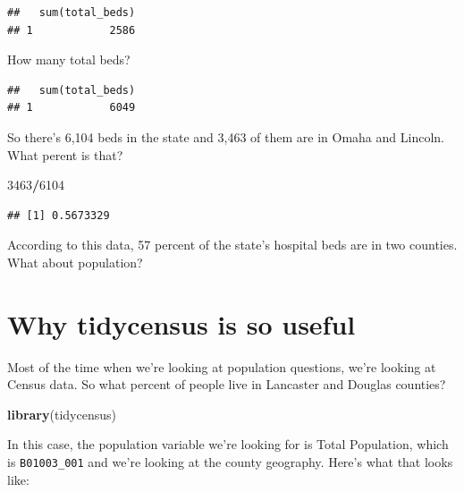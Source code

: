 \documentclass[]{book}
\newenvironment{Shaded}{\begin{snugshade}}{\end{snugshade}}
\newcommand{\DecValTok}[1]{\textcolor[rgb]{0.00,0.00,0.81}{#1}}
\newcommand{\KeywordTok}[1]{\textcolor[rgb]{0.13,0.29,0.53}{\textbf{#1}}}
\newcommand{\NormalTok}[1]{#1}
\newcommand{\OperatorTok}[1]{\textcolor[rgb]{0.81,0.36,0.00}{\textbf{#1}}}
\newcommand{\StringTok}[1]{\textcolor[rgb]{0.31,0.60,0.02}{#1}}
\begin{document}
\begin{verbatim}
##   sum(total_beds)
## 1            2586
\end{verbatim}

How many total beds?

\begin{Shaded}
\end{Shaded}

\begin{verbatim}
##   sum(total_beds)
## 1            6049
\end{verbatim}

So there's 6,104 beds in the state and 3,463 of them are in Omaha and Lincoln. What perent is that?

\begin{Shaded}
\begin{Highlighting}[]
\DecValTok{3463}\OperatorTok{/}\DecValTok{6104}
\end{Highlighting}
\end{Shaded}

\begin{verbatim}
## [1] 0.5673329
\end{verbatim}

According to this data, 57 percent of the state's hospital beds are in two counties. What about population?

\hypertarget{why-tidycensus-is-so-useful}{%
\section{Why tidycensus is so useful}\label{why-tidycensus-is-so-useful}}

Most of the time when we're looking at population questions, we're looking at Census data. So what percent of people live in Lancaster and Douglas counties?

\begin{Shaded}
\begin{Highlighting}[]
\KeywordTok{library}\NormalTok{(tidycensus)}
\end{Highlighting}
\end{Shaded}

In this case, the population variable we're looking for is Total Population, which is \texttt{B01003\_001} and we're looking at the county geography. Here's what that looks like:
\end{document}
